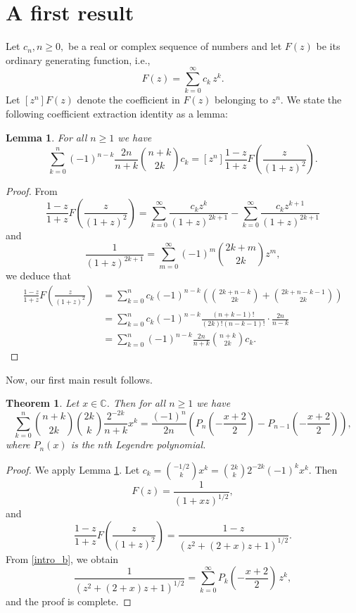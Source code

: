 \documentclass[11pt,reqno]{amsart}
\theoremstyle{plain}
\numberwithin{equation}{section}
\newtheorem{theorem}[thm]{Theorem}
\newtheorem{lemma}[thm]{Lemma}
\begin{document}
\section{A first result}

Let $c_n, n\geq 0,$ be a real or complex sequence of numbers and let $F(z)$ be its ordinary generating function, i.e.,
$$F(z)=\sum_{k=0}^\infty c_k\,z^k.$$
Let $[z^n]F(z)$ denote the coefficient in $F(z)$ belonging to $z^n$. We state the following coefficient extraction identity 
as a lemma:
\begin{lemma}\label{main_lem}
For all $n\geq 1$ we have
\begin{equation}
\sum_{k=0}^n (-1)^{n-k} \frac{2n}{n+k} \binom{n+k}{2k} c_k = [z^n] \frac{1-z}{1+z}F\left (\frac{z}{(1+z)^2}\right ).
\end{equation}
\end{lemma}
\begin{proof}
From
\[\frac{1-z}{1+z}F\left (\frac{z}{(1+z)^2}\right )=\sum_{k=0}^{\infty}\frac{c_k z^k}{(1+z)^{2k+1}}-\sum_{k=0}^{\infty}\frac{c_k z^{k+1}}{(1+z)^{2k+1}}\]
and 
\[\frac{1}{(1+z)^{2k+1}} = \sum_{m=0}^{\infty} (-1)^m \binom{2k+m}{2k} z^m,\]
we deduce that
\begin{align*}
[z^n] \frac{1-z}{1+z}F\left (\frac{z}{(1+z)^2}\right ) &= \sum_{k=0}^n c_k(-1)^{n-k} \left(\binom{2k+n-k}{2k}+\binom{2k+n-k-1}{2k} \right) \\
&= \sum_{k=0}^n c_k (-1)^{n-k} \frac{(n+k-1)!}{(2k)!(n-k-1)!}\cdot\frac{2n}{n-k} \\
&= \sum_{k=0}^n (-1)^{n-k} \frac{2n}{n+k} \binom{n+k}{2k} c_k. 
\end{align*}
\end{proof}

Now, our first main result follows.

\begin{theorem}\label{main_thm}
Let $x\in\mathbb{C}$. Then for all $n\geq 1$ we have
\begin{equation}
\sum_{k=0}^n \binom{n+k}{2k} \binom{2k}{k} \frac{2^{-2k}}{n+k} x^k 
= \frac{(-1)^n}{2n} \left ( P_n\left (-\frac{x+2}{2}\right ) - P_{n-1}\left (-\frac{x+2}{2}\right )\right ),
\end{equation}
where $P_n(x)$ is the $n$th Legendre polynomial.
\end{theorem}
\begin{proof}
We apply Lemma \ref{main_lem}. Let $c_k=\binom{-1/2}{k}x^k=\binom{2k}{k}2^{-2k} (-1)^k x^k.$ Then
$$F(z) = \frac{1}{(1+xz)^{1/2}},$$
and
$$\frac{1-z}{1+z} F\left (\frac{z}{(1+z)^2}\right ) = \frac{1-z}{(z^2+(2+x)z+1)^{1/2}}.$$
From \eqref{intro_b}, we obtain
$$\frac{1}{(z^2+(2+x)z+1)^{1/2}} = \sum_{k=0}^\infty P_k\left (-\frac{x+2}{2}\right )\,z^k, $$
and the proof is complete.
\end{proof}
\end{document}
